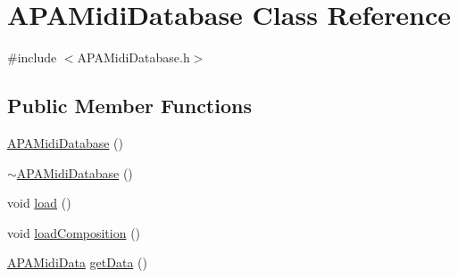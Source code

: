 \hypertarget{class_a_p_a_midi_database}{\section{A\+P\+A\+Midi\+Database Class Reference}
\label{class_a_p_a_midi_database}
}


{\ttfamily \#include $<$A\+P\+A\+Midi\+Database.\+h$>$}

\subsection*{Public Member Functions}
\begin{DoxyCompactItemize}
\item 
\hyperlink{class_a_p_a_midi_database_a74c56afddf6b0dd53727b64cdd407cbe}{A\+P\+A\+Midi\+Database} ()
\item 
\hyperlink{class_a_p_a_midi_database_abc39fdf72bb5abd3743041b92b2566ea}{$\sim$\+A\+P\+A\+Midi\+Database} ()
\item 
void \hyperlink{class_a_p_a_midi_database_a6318128aaa8d714ebbb4831477e1b92f}{load} ()
\item 
void \hyperlink{class_a_p_a_midi_database_a2f442d74f42dfd128b1af1ae4efeefbf}{load\+Composition} ()
\item 
\hyperlink{class_a_p_a_midi_data}{A\+P\+A\+Midi\+Data} \hyperlink{class_a_p_a_midi_database_a047f8526f4910efc4e39c309f216bb9d}{get\+Data} ()
\end{DoxyCompactItemize}


